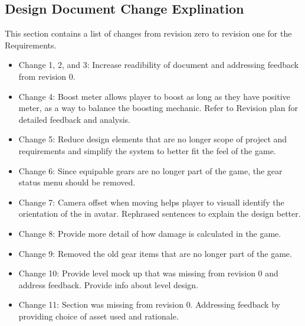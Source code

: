 \documentclass[]{article}
\begin{document}
\subsection*{Design Document Change Explination}
This section contains a list of changes from revision zero to revision one for the Requirements.
 \begin{itemize}
		\item Change 1, 2, and 3: Increase readibility of document and addressing feedback from revision 0.
		\item Change 4: Boost meter allows player to boost as long as they have positive meter,  as a way to balance the boosting mechanic. Refer to Revision plan for detailed feedback and analysis.
		\item Change 5: Reduce design elements that are no longer scope of project and requirements and simplify the system to better fit the feel of the game.
		\item Change 6: Since equipable gears are no longer part of the game, the gear status menu should be removed.
		\item Change 7: Camera offset when moving helps player to visuall identify the orientation of the in avatar. Rephrased sentences to explain the design better.
		\item Change 8: Provide more detail of how damage is calculated in the game.
		\item Change 9: Removed the old gear items that are no longer part of the game.
		\item Change 10: Provide level mock up that was missing from revision 0 and address feedback. Provide info about level design.
		\item Change 11: Section was missing from revision 0. Addressing feedback by providing choice of asset used and rationale.
 \end{itemize}
\end{document}
